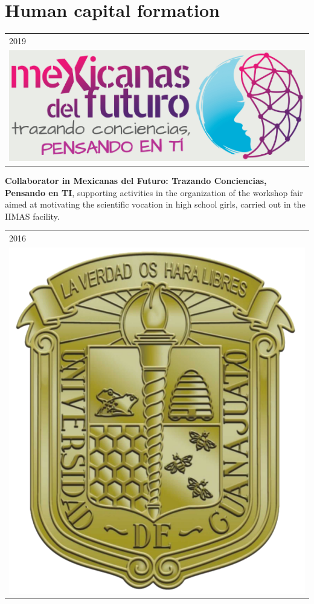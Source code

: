 \documentclass[]{friggeri-cv}
\begin{document}
\section{Human capital formation}
\begin{entrylist}
    \entry
     {   \begin{tabular}{l}
    		\hspace{0.9cm}2019\\
     		\includegraphics[scale=0.15]{img/mexicanas.png}
	\end{tabular}
    }
    {\vspace{-0.99cm}}
    { }
    {\textbf{Collaborator in Mexicanas del Futuro: Trazando Conciencias, Pensando en TI}, supporting activities in the organization of the workshop fair aimed at motivating the scientific vocation in high school girls, carried out in the IIMAS facility.}
 \entry
    {   \begin{tabular}{l}
    		\hspace{0.8cm}2016\\
     		\hspace{0.4cm}\includegraphics[scale=0.5]{img/UGTO.png}

\end{tabular}}
\end{entrylist}
\end{document}
